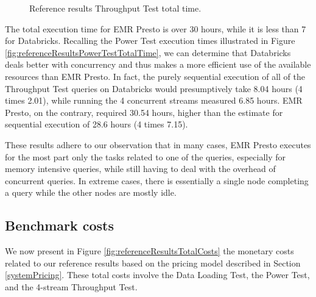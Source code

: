 \begin{figure}
   \begin{center}
   \end{center}
   \caption{Reference results Throughput Test total time.}
   \label{fig:referenceResultsTputTotalTime}
\end{figure}

The total execution time for EMR Presto is over 30 hours, while it is less than 7 for Databricks. Recalling the Power Test execution times illustrated in Figure \ref{fig:referenceResultsPowerTestTotalTime}, we can determine that Databricks deals better with concurrency and thus makes a more efficient use of the available resources than EMR Presto. In fact, the purely sequential execution of all of the Throughput Test queries on Databricks would presumptively take 8.04 hours (4 times 2.01), while running the 4 concurrent streams measured 6.85 hours. EMR Presto, on the contrary, required 30.54 hours, higher than the estimate for sequential execution of 28.6 hours (4 times 7.15).

These results adhere to our observation that in many cases, EMR Presto executes for the most part only the tasks related to one of the queries, especially for memory intensive queries, while still having to deal with the overhead of concurrent queries. In extreme cases, there is essentially a single node completing a query while the other nodes are mostly idle.

\subsection{Benchmark costs}

We now present in Figure \ref{fig:referenceResultsTotalCosts} the monetary costs related to our reference results based on the pricing model described in Section \ref{systemPricing}. These total costs involve the Data Loading Test, the Power Test, and the 4-stream Throughput Test.

